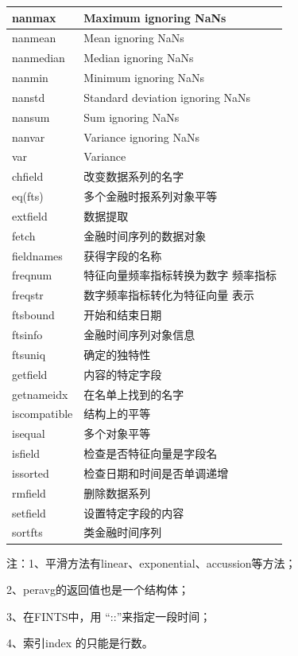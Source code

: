 \begin{longtable}{|l|l|}
            nanmax & Maximum ignoring NaNs\\\hline
            nanmean & Mean ignoring NaNs\\\hline
            nanmedian & Median ignoring NaNs\\\hline
            nanmin & Minimum ignoring NaNs\\\hline
            nanstd & Standard deviation ignoring NaNs\\\hline
            nansum & Sum ignoring NaNs\\\hline
            nanvar & Variance ignoring NaNs\\\hline
            var & Variance\\\hline
            chfield & 改变数据系列的名字\\\hline
            eq(fts) & 多个金融时报系列对象平等\\\hline
            extfield & 数据提取\\\hline
            fetch & 金融时间序列的数据对象\\\hline
            fieldnames & 获得字段的名称\\\hline
            freqnum & 特征向量频率指标转换为数字 频率指标\\\hline
            freqstr & 数字频率指标转化为特征向量 表示\\\hline
            ftsbound& 开始和结束日期\\\hline
            ftsinfo  & 金融时间序列对象信息\\\hline
            ftsuniq & 确定的独特性\\\hline
            getfield & 内容的特定字段\\\hline
            getnameidx  &在名单上找到的名字\\\hline
            iscompatible & 结构上的平等\\\hline
            isequal & 多个对象平等\\\hline
            isfield & 检查是否特征向量是字段名\\\hline
            issorted & 检查日期和时间是否单调递增\\\hline
            rmfield &  删除数据系列\\\hline
            setfield & 设置特定字段的内容\\\hline
            sortfts  & 类金融时间序列\\\hline
            \end{longtable}
            \noindent
            注：1、平滑方法有linear、exponential、accussion等方法；
            \par
            2、peravg的返回值也是一个结构体；
            \par
            3、在FINTS中，用 “::”来指定一段时间；
            \par
            4、索引index 的只能是行数。
